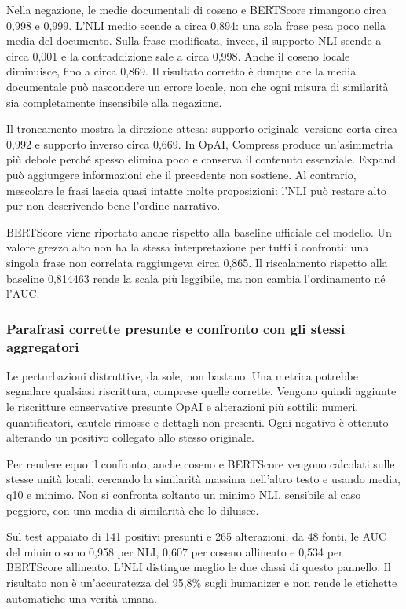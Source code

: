Nella negazione, le medie documentali di coseno e BERTScore rimangono circa 0,998 e 0,999. L'NLI medio scende a circa 0,894: una sola frase pesa poco nella media del documento. Sulla frase modificata, invece, il supporto NLI scende a circa 0,001 e la contraddizione sale a circa 0,998. Anche il coseno locale diminuisce, fino a circa 0,869. Il risultato corretto è dunque che la media documentale può nascondere un errore locale, non che ogni misura di similarità sia completamente insensibile alla negazione.

Il troncamento mostra la direzione attesa: supporto originale--versione corta circa 0,992 e supporto inverso circa 0,669. In OpAI, Compress produce un'asimmetria più debole perché spesso elimina poco e conserva il contenuto essenziale. Expand può aggiungere informazioni che il precedente non sostiene. Al contrario, mescolare le frasi lascia quasi intatte molte proposizioni: l'NLI può restare alto pur non descrivendo bene l'ordine narrativo.

BERTScore viene riportato anche rispetto alla baseline ufficiale del modello. Un valore grezzo alto non ha la stessa interpretazione per tutti i confronti: una singola frase non correlata raggiungeva circa 0,865. Il riscalamento rispetto alla baseline 0,814463 rende la scala più leggibile, ma non cambia l'ordinamento né l'AUC.

\subsubsection{Parafrasi corrette presunte e confronto con gli stessi aggregatori}\label{parafrasi-corrette-presunte-e-confronto-con-gli-stessi-aggregatori}

Le perturbazioni distruttive, da sole, non bastano. Una metrica potrebbe segnalare qualsiasi riscrittura, comprese quelle corrette. Vengono quindi aggiunte le riscritture conservative presunte OpAI e alterazioni più sottili: numeri, quantificatori, cautele rimosse e dettagli non presenti. Ogni negativo è ottenuto alterando un positivo collegato allo stesso originale.

Per rendere equo il confronto, anche coseno e BERTScore vengono calcolati sulle stesse unità locali, cercando la similarità massima nell'altro testo e usando media, q10 e minimo. Non si confronta soltanto un minimo NLI, sensibile al caso peggiore, con una media di similarità che lo diluisce.

Sul test appaiato di 141 positivi presunti e 265 alterazioni, da 48 fonti, le AUC del minimo sono 0,958 per NLI, 0,607 per coseno allineato e 0,534 per BERTScore allineato. L'NLI distingue meglio le due classi di questo pannello. Il risultato non è un'accuratezza del 95,8\% sugli humanizer e non rende le etichette automatiche una verità umana.

